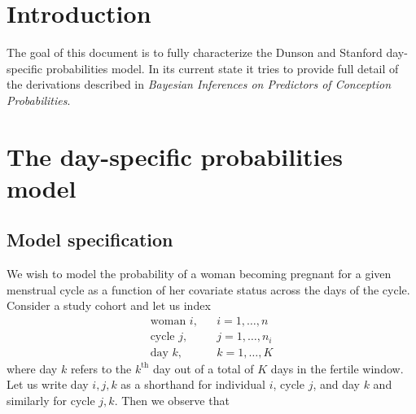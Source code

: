 \documentclass[11pt]{article}
\begin{document}
\setcounter{section}{-1}
\section{Introduction}
The goal of this document is to fully characterize the Dunson and Stanford day-specific probabilities model.  In its current state it tries to provide full detail of the derivations described in \textit{Bayesian Inferences on Predictors of Conception Probabilities}.


\section{The day-specific probabilities model}

\subsection{Model specification}
We wish to model the probability of a woman becoming pregnant for a given menstrual cycle as a function of her covariate status across the days of the cycle.  Consider a study cohort and let us index
\[ \begin{array}{lll}
\text{woman } i, & & i = 1,\dots,n   \\[1ex]
\text{cycle } j, & & j = 1,\dots,n_i \\[1ex]
\text{day }   k, & & k = 1,\dots,K
\end{array} \]
where day $k$ refers to the $k^\text{th}$ day out of a total of $K$ days in the fertile window.  Let us write day $i,j,k$ as a shorthand for individual $i$, cycle $j$, and day $k$ and similarly for cycle $j,k$.  Then we observe that
\end{document}
